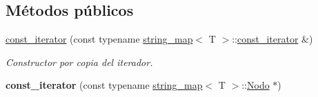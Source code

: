 \subsection*{Métodos públicos}
\begin{DoxyCompactItemize}
\item 
\hyperlink{classstring__map_1_1const__iterator_a34833166008a59e0d3b4758ba1154a9f}{const\-\_\-iterator} (const typename \hyperlink{classstring__map}{string\-\_\-map}$<$ T $>$\-::\hyperlink{classstring__map_1_1const__iterator}{const\-\_\-iterator} \&)
\begin{DoxyCompactList}\small\item\em Constructor por copia del iterador. \end{DoxyCompactList}\item 
\hypertarget{classstring__map_1_1const__iterator_acc80ad43b0d553e73a42c286f2f1edae}{{\bfseries const\-\_\-iterator} (const typename \hyperlink{classstring__map}{string\-\_\-map}$<$ T $>$\-::\hyperlink{structstring__map_1_1Nodo}{Nodo} $\ast$)}\label{classstring__map_1_1const__iterator_acc80ad43b0d553e73a42c286f2f1edae}


\end{DoxyCompactItemize}
